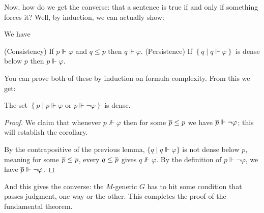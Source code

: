Now, how do we get the converse: that a sentence is true if and only if something forces it?
Well, by induction, we can actually show:
\begin{lemma}
	We have
	\begin{enumerate}[(1)]
		\ii (Consistency) If $p \Vdash \varphi$ and $q \le p$ then $q \Vdash \varphi$.
		\ii (Persistence) If $\left\{ q \mid q \Vdash \varphi \right\}$
		is dense below $p$ then $p \Vdash \varphi$.
	\end{enumerate}
\end{lemma}
You can prove both of these by induction on formula complexity.
From this we get:
\begin{corollary}[Completeness]
	The set $\left\{ p \mid p \Vdash \varphi \text{ or } p \Vdash \neg\varphi \right\}$
	is dense.
\end{corollary}
\begin{proof}
	We claim that whenever $p \not\Vdash \varphi$ then
	for some $\overline p \le p$ we have $\overline p \Vdash \neg\varphi$;
	this will establish the corollary.

	By the contrapositive of the previous lemma,
	$\{q \mid q \Vdash \varphi\}$ is not dense below $p$,
	meaning for some $\overline p \le p$, every $q \le \overline p$ gives $q \not\Vdash \varphi$.
	By the definition of $p \Vdash \neg\varphi$,
	we have $\overline p \Vdash \neg\varphi$.
\end{proof}
And this gives the converse: the $M$-generic $G$ has to hit some condition
that passes judgment, one way or the other.
This completes the proof of the fundamental theorem.

